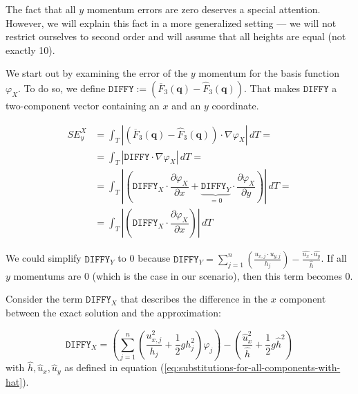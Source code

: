 \documentclass{article}
\newcommand{\pd}[2]{\dfrac{\partial #1}{\partial #2}}
\renewcommand{\phi}{\varphi}
\begin{document}
The fact that all $y$ momentum errors are zero deserves a special attention. However, we will explain this fact in a more generalized setting --- we will not restrict ourselves to second order and will assume that all heights are equal (not exactly 10).



We start out by examining the error of the $y$ momentum for the basis function $\phi_X$. To do so, we define $\mathtt{DIFFY}:=\left( \overline{F}_3(\mathbf{q}) - \widehat{F}_3(\mathbf{q}) \right)$. That makes $\mathtt{DIFFY}$ a two-component vector containing an $x$ and an $y$ coordinate.

\begin{align*}
  SE_y^X &= \int_T \left| \left( \overline{F}_3(\mathbf{q}) - \widehat{F}_3(\mathbf{q}) \right) \cdot \nabla \phi_X \right| \, dT = \\
  &= \int_T \left| \mathtt{DIFFY} \cdot \nabla \phi_X \right|\,dT = \\
  &= \int_T \left| \left( \mathtt{DIFFY}_X \cdot \pd{\phi_X}{x} + \underbrace{\mathtt{DIFFY}_Y}_{=0} \cdot \pd{\phi_X}{y} \right) \right| \, dT = \\
  &=\int_T \left| \left( \mathtt{DIFFY}_X \cdot \pd{\phi_X}{x} \right) \right| \, dT
\end{align*}

We could simplify $\mathtt{DIFFY}_Y$ to 0 because $\mathtt{DIFFY}_Y=\sum_{j=1}^n\left( \frac{u_{x,j}\cdot u_{y,j}}{h_j} \right)-\frac{\widehat{u_x}\cdot\widehat{u_y}}{\widehat{h}}$. If all $y$ momentums are 0 (which is the case in our scenario), then this term becomes 0.

Consider the term $\mathtt{DIFFY}_X$ that describes the difference in the $x$ component between the exact solution and the approximation:

\begin{equation*}
  \mathtt{DIFFY}_X = \left( \sum_{j=1}^n \left(\frac{u_{x,j}^2}{h_j} + \frac{1}{2} g h_j^2\right) \phi_j \right) - \left( \frac{\widehat{u}_x^2}{\widehat h} + \frac{1}{2} g \widehat{h}^2\right)
\end{equation*}
with $\widehat h, \widehat{u}_x, \widehat{u}_y$ as defined in equation (\ref{eq:substitutions-for-all-components-with-hat}).
\end{document}
